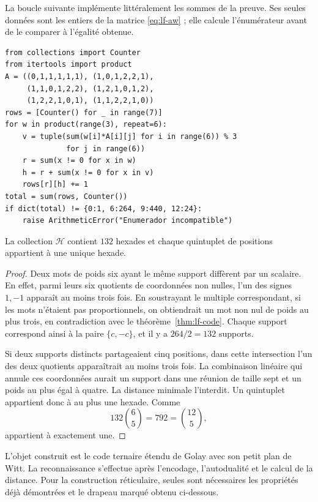 \begin{remark}
La boucle suivante implémente littéralement les sommes de la preuve. Ses seules données sont les entiers de la matrice \eqref{eq:lf-aw} ; elle calcule l'énumérateur avant de le comparer à l'égalité obtenue.
\end{remark}
{\small
\begin{verbatim}
from collections import Counter
from itertools import product
A = ((0,1,1,1,1,1), (1,0,1,2,2,1),
     (1,1,0,1,2,2), (1,2,1,0,1,2),
     (1,2,2,1,0,1), (1,1,2,2,1,0))
rows = [Counter() for _ in range(7)]
for w in product(range(3), repeat=6):
    v = tuple(sum(w[i]*A[i][j] for i in range(6)) % 3
              for j in range(6))
    r = sum(x != 0 for x in w)
    h = r + sum(x != 0 for x in v)
    rows[r][h] += 1
total = sum(rows, Counter())
if dict(total) != {0:1, 6:264, 9:440, 12:24}:
    raise ArithmeticError("Enumerador incompatible")
\end{verbatim}
}

\begin{proposition}
\label{prop:lf-witt}
La collection \(\mathcal H\) contient \(132\) hexades et chaque quintuplet de positions appartient à une unique hexade.
\end{proposition}
\begin{proof}
Deux mots de poids six ayant le même support diffèrent par
un scalaire. En effet, parmi leurs six quotients de coordonnées
non nulles, l’un des signes \(1,-1\) apparaît au moins trois
fois. En soustrayant le multiple correspondant, si les mots
n’étaient pas proportionnels, on obtiendrait un mot non nul
de poids au plus trois, en contradiction avec
le théorème~\ref{thm:lf-code}. Chaque support correspond ainsi à
la paire \(\{c,-c\}\), et il y a \(264/2=132\) supports.

Si deux supports distincts partageaient cinq positions, dans cette intersection l'un des deux quotients apparaîtrait au moins trois fois. La combinaison linéaire qui annule ces coordonnées aurait un support dans une réunion de taille sept et un poids au plus égal à quatre. La distance minimale l'interdit. Un quintuplet appartient donc à au plus une hexade. Comme
\[
 132\binom65=792=\binom{12}{5},
\]
appartient à exactement une.
\end{proof}

L’objet construit est le code ternaire étendu de Golay
avec son petit plan de Witt. La reconnaissance s’effectue
après l’encodage, l’autodualité et le calcul de la
distance. Pour la construction réticulaire, seules sont nécessaires
les propriétés déjà démontrées et le drapeau marqué obtenu
ci-dessous.

